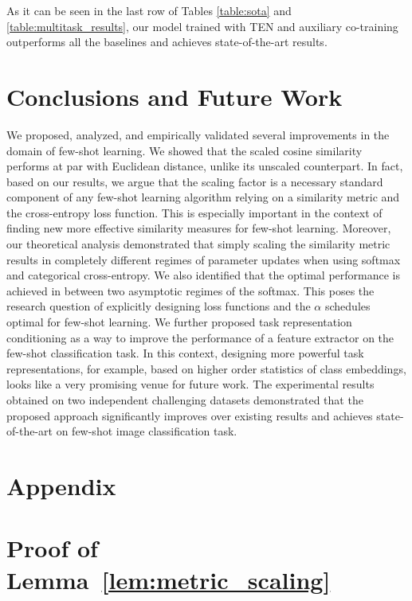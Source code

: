 \documentclass{article}
\begin{document}
As it can be seen in the last row of Tables \ref{table:sota} and \ref{table:multitask_results}, our model trained with TEN and auxiliary co-training outperforms all the baselines and achieves state-of-the-art results.



\section{Conclusions and Future Work} \label{sec:conclusions}
We proposed, analyzed, and empirically validated several improvements in the domain of few-shot learning. We showed that the scaled cosine similarity performs at par with Euclidean distance, unlike its unscaled counterpart. In fact, based on our results, we argue that the scaling factor is a necessary standard component of any few-shot learning algorithm relying on a similarity metric and the cross-entropy loss function. This is especially important in the context of finding new more effective similarity measures for few-shot learning. Moreover, our theoretical analysis demonstrated that simply scaling the similarity metric results in completely different regimes of parameter updates when using softmax and categorical cross-entropy. We also identified that the optimal performance is achieved in between two asymptotic regimes of the softmax. This poses the research question of explicitly designing loss functions and the $\alpha$ schedules optimal for few-shot learning. We further proposed task representation conditioning as a way to improve the performance of a feature extractor on the few-shot classification task. In this context, designing more powerful task representations, for example, based on higher order statistics of class embeddings, looks like a very promising venue for future work. The experimental results obtained on two independent challenging datasets demonstrated that the proposed approach significantly improves over existing results and achieves state-of-the-art on few-shot image classification task.  

\appendix
\section*{Appendix}

\section{Proof of Lemma~\ref{lem:metric_scaling}} \label{ssec:proof_of_metric_scaling_lemma}
\end{document}
